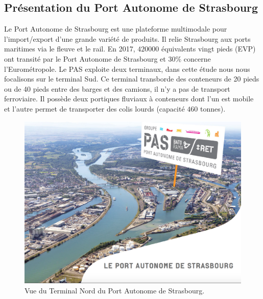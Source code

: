 \documentclass{article}
\begin{document}
%









\subsection{Présentation du Port Autonome de Strasbourg}


Le Port Autonome de Strasbourg est une plateforme multimodale pour l'import/export d'une grande variété de produits. Il relie Strasbourg aux ports maritimes via le fleuve et le rail. En 2017, $420000$ équivalents vingt pieds (EVP) ont transité par le Port Autonome de Strasbourg et $30\%$ concerne l'Eurométropole. Le PAS exploite deux terminaux, dans cette étude nous nous focalisons sur le terminal Sud. Ce terminal transborde des conteneurs de 20 pieds ou de 40 pieds entre des barges et des camions, il n'y a pas de transport ferroviaire. Il possède deux portiques fluviaux à conteneurs dont l'un est mobile et l'autre permet de transporter des colis lourds (capacité $460$ tonnes).




\begin{figure}[!htb]
\centering
\includegraphics[width=0.7\linewidth]{images/PAS_satellite.png}
\caption{Vue du Terminal Nord du Port Autonome de Strasbourg.}
\label{fig:pas_satellite}
\end{figure}
\end{document}

